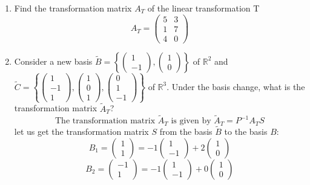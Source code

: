 \documentclass[a3paper,12pt]{extarticle} %
\begin{document}
\begin{enumerate}
\[    \]
    \begin{enumerate}
        \item Find the transformation matrix \(A_T\) of the linear transformation T
        \[
            A_T = \begin{pmatrix} 5 & 3 \\ 1 & 7 \\ 4 & 0 \end{pmatrix}
        \]
        \item Consider a new basis \(\tilde{B} = \left\{ \begin{pmatrix} 1 \\ -1 \end{pmatrix}, \begin{pmatrix} 1 \\ 0 \end{pmatrix} \right\}\) of \(\mathbb{R}^2\) and \(\tilde{C} = \left\{ \begin{pmatrix} 1 \\ -1 \\ 1 \end{pmatrix}, \begin{pmatrix} 1 \\ 0 \\ 1 \end{pmatrix}, \begin{pmatrix} 0 \\ 1 \\ -1 \end{pmatrix} \right\}\) of \(\mathbb{R}^3\). Under the basis change, what is the transformation matrix \(\tilde{A}_T\)?
        \[
            \text{The transformation matrix } \tilde{A}_T \text{ is given by } \tilde{A}_T = P^{-1}A_TS
        \]
        let us get the transformation matrix \( S \) from the basis \( \tilde{B} \) to the basis \( B \):
        \[
            B_1 = \begin{pmatrix} 1 \\ 1 \end{pmatrix} = -1 \begin{pmatrix} 1 \\ -1 \end{pmatrix} + 2 \begin{pmatrix} 1 \\ 0 \end{pmatrix}
        \]
        \[
            B_2 = \begin{pmatrix} -1 \\ 1 \end{pmatrix} = -1 \begin{pmatrix} 1 \\ -1 \end{pmatrix} + 0 \begin{pmatrix} 1 \\ 0 \end{pmatrix}
\]
\end{enumerate}
\end{enumerate}
\end{document}
